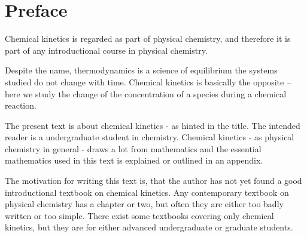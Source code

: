 \chapter*{Preface}

Chemical kinetics is regarded as part of physical chemistry, and
therefore it is part of any introductional course in physical
chemistry.

Despite the name, thermodynamics is a science of equilibrium \ie the
systems studied do not change with time. Chemical kinetics is
basically the opposite -- here we study the change of the
concentration of a species during a chemical reaction.

The present text is about chemical kinetics - as hinted in the
title. The intended reader is a undergraduate student in
chemistry. Chemical kinetics - as physical chemistry in general -
draws a lot from mathematics and the essential mathematics used in
this text is explained or outlined in an appendix.

The motivation for writing this text is, that the author has not yet
found a good introductional textbook on chemical kinetics. Any
contemporary textbook on physical chemistry has a chapter or two, but
often they are either too badly written or too simple. There exist
some textbooks covering only chemical kinetics, but they are for
either advanced undergraduate or graduate students.


